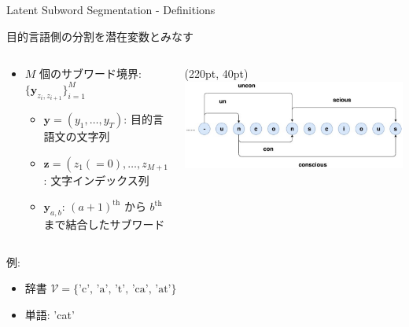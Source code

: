 \documentclass[unicode, 12pt, aspectratio=43]{beamer}
\begin{document}
\begin{frame}[label={sec:orgcfeb290}]{Latent Subword Segmentation - Definitions}
\begin{block}{\hspace{-0.75cm}目的言語側の分割を潜在変数とみなす}
\begin{columns}
\begin{column}{1.0\columnwidth}
\begin{itemize}
\item \(M\) 個のサブワード境界: \(\{\boldsymbol{y}_{z_i, z_{i+1}}\}_{i=1}^M\)
\begin{itemize}
\item \(\boldsymbol{y} = (y_1, \ldots, y_T)\): 目的言語文の文字列
\item \(\boldsymbol{z} = (z_1 (=0),\ldots,z_{M+1} (=T))\): 文字インデックス列
\item \(\boldsymbol{y}_{a,b}\): \((a+1)^\text{th}\) から \(b^\text{th}\) まで結合したサブワード
\end{itemize}
\end{itemize}
\end{column}

\begin{column}{0.465\columnwidth}
\begin{textblock*}{\linewidth}(220pt, 40pt)
    \centering
    \includegraphics[width=\linewidth]{./figure/Figure1.pdf}
\end{textblock*}
\end{column}
\end{columns}
\end{block}

\begin{columns}
\begin{column}{0.5\columnwidth}
\begin{block}{例:}
\footnotesize
\begin{itemize}
\item 辞書 \(\mathcal{V} = \{\text{'c', 'a', 't', 'ca', 'at'}\}\)
\item 単語: 'cat'
\end{itemize}
\end{block}
\end{column}


\end{columns}
\end{frame}
\end{document}
